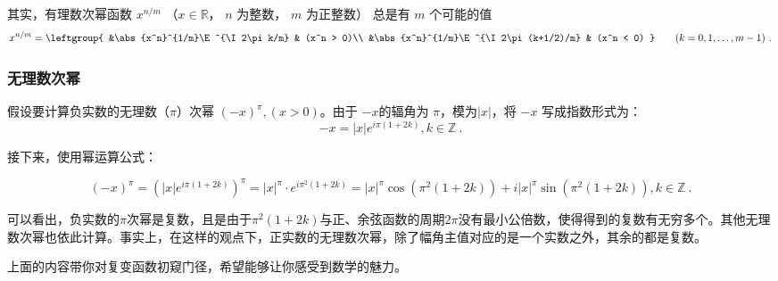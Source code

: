 其实，有理数次幂函数 $x^{n/m}$ （$x\in \mathbb R$， $n$ 为整数， $m$ 为正整数） 总是有 $m$ 个可能的值
\begin{equation}
x^{n/m} = \leftgroup{
&\abs{x^n}^{1/m}\E^{\I 2\pi k/m} & (x^n > 0)\\
&\abs{x^n}^{1/m}\E^{\I 2\pi (k+1/2)/m} & (x^n < 0)
}\qquad (k = 0,1,\dots, m-1)~.
\end{equation}

\subsubsection{无理数次幂}

假设要计算负实数的无理数（$\pi$）次幂 $(-x)^\pi,(x>0)$。由于 $-x$的辐角为 $\pi$，模为$|x|$，将 $-x$ 写成指数形式为：
\begin{equation}
-x = |x| e^{i\pi(1+2k)},k\in\mathbb{Z}~.
\end{equation}

接下来，使用幂运算公式：

\begin{equation}
(-x)^\pi = \left( |x| e^{i\pi(1+2k)} \right)^\pi =|x|^\pi \cdot e^{i\pi^2(1+2k)}=|x|^\pi\cos(\pi^2(1+2k)) + i|x|^\pi\sin(\pi^2(1+2k)),k\in\mathbb{Z}~.
\end{equation}

可以看出，负实数的$\pi$次幂是复数，且是由于$\pi^2(1+2k)$与正、余弦函数的周期$2\pi$没有最小公倍数，使得得到的复数有无穷多个。其他无理数次幂也依此计算。事实上，在这样的观点下，正实数的无理数次幂，除了幅角主值对应的是一个实数之外，其余的都是复数。

上面的内容带你对复变函数初窥门径，希望能够让你感受到数学的魅力。